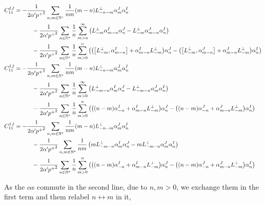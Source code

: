 \begin{align*}
    C_{11}^{IJ}&=-\frac{1}{2\alpha'{p^+}^2}\sum\limits_{n,m\in\mathbb N^\ast}\frac{1}{nm}\qty(m-n)L^\perp_{-n-m}\alpha^J_m\alpha^I_n\\
    &\quad\quad\quad-\frac{1}{2\alpha'{p^+}^2}\sum\limits_{n\in\mathbb N^\ast}\frac{1}{n}\sum\limits_{m>n}^\infty\left(L^\perp_{-m}\alpha^I_{m-n}\alpha^J_n-L^\perp_{-m}\alpha^J_{m-n}\alpha^I_n\right)\\
    &\quad\quad\quad-\frac{1}{2\alpha'{p^+}^2}\sum\limits_{n\in\mathbb N^\ast}\frac{1}{n}\sum\limits_{m>0}^{n}\left(\qty(\comm{L^\perp_{-m}}{\alpha^I_{m-n}}+\alpha_{m-n}^IL^\perp_{-m})\alpha^J_n-\qty(\comm{L^\perp_{-m}}{\alpha^J_{m-n}}+\alpha^J_{m-n}L^\perp_{-m})\alpha^I_n\right)\\
    C_{11}^{IJ}&=-\frac{1}{2\alpha'{p^+}^2}\sum\limits_{n,m\in\mathbb N^\ast}\frac{1}{nm}\qty(m-n)L^\perp_{-n-m}\alpha^J_m\alpha^I_n\\
    &\quad\quad\quad-\frac{1}{2\alpha'{p^+}^2}\sum\limits_{n\in\mathbb N^\ast}\frac{1}{n}\sum\limits_{m>0}^\infty\left(L^\perp_{-m-n}\alpha^I_{m}\alpha^J_n-L^\perp_{-m-n}\alpha^J_{m}\alpha^I_n\right)\\
    &\quad\quad\quad-\frac{1}{2\alpha'{p^+}^2}\sum\limits_{n\in\mathbb N^\ast}\frac{1}{n}\sum\limits_{m>0}^{n}\left(\qty(\qty(n-m)\alpha^I_{-n}+\alpha_{m-n}^IL^\perp_{-m})\alpha^J_n-\qty(\qty(n-m)\alpha^J_{-n}+\alpha^J_{m-n}L^\perp_{-m})\alpha^I_n\right)\\
    C_{11}^{IJ}&=-\frac{1}{2\alpha'{p^+}^2}\sum\limits_{n,m\in\mathbb N^\ast}\frac{1}{nm}\qty(m-n)L^\perp_{-n-m}\alpha^J_m\alpha^I_n\\
    &\quad\quad\quad-\frac{1}{2\alpha'{p^+}^2}\sum\limits_{n,m\in\mathbb N^\ast}\frac{1}{nm}\left(mL^\perp_{-m-n}\alpha^I_{m}\alpha^J_n-mL^\perp_{-m-n}\alpha^J_{m}\alpha^I_n\right)\\
    &\quad\quad\quad-\frac{1}{2\alpha'{p^+}^2}\sum\limits_{n\in\mathbb N^\ast}\frac{1}{n}\sum\limits_{m>0}^{n}\left(\qty(\qty(n-m)\alpha^I_{-n}+\alpha_{m-n}^IL^\perp_{-m})\alpha^J_n-\qty(\qty(n-m)\alpha^J_{-n}+\alpha^J_{m-n}L^\perp_{-m})\alpha^I_n\right)
\end{align*}

As the $\alpha$s commute in the second line, due to $n,m>0$, we exchange them in the first term and them relabel $n\leftrightarrow m$ in it,

